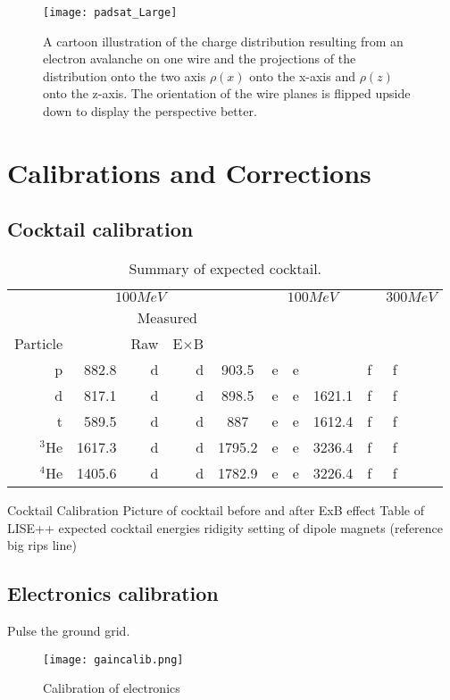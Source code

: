 \begin{figure}[H]
\texttt{[image: padsat\_Large]}
\caption{A cartoon illustration of the charge distribution resulting from an electron avalanche on one wire and the projections of the distribution onto the two axis $\rho(x)$ onto the x-axis and $\rho(z)$ onto the z-axis. The orientation of the wire planes is flipped upside down to display the perspective better.}
\label{fig:prf}
\end{figure}



\section{Calibrations and Corrections}


\subsection{Cocktail calibration}

\begin{table*}\centering
{}
\begin{tabular}{@{}rrrrcrrrcrrr@{}}\toprule
& \multicolumn{3}{c}{$100 MeV$} & \phantom{abc}& \multicolumn{3}{c}{$100 MeV$} &
\phantom{abc} & \multicolumn{3}{c}{$300 MeV$}\\
\cmidrule{2-4} \cmidrule{6-8} \cmidrule{10-12}
& &\multicolumn{2}{c}{Measured}\\
Particle &\phantom{abc} & Raw & E$\times$B\\
\midrule
p   & 882.8 & d & d & 903.5 & e & e &\phantom{abcdef} & f & f \\
d   & 817.1 & d & d & 898.5 & e & e & 1621.1 & f & f\\
t   & 589.5 & d & d & 887 & e & e & 1612.4 & f & f  \\
$^{3}$He  & 1617.3  & d & d & 1795.2 & e & e & 3236.4 & f & f\\
$^{4}$He  & 1405.6  & d & d & 1782.9 & e & e & 3226.4 & f & f \\
\bottomrule
\end{tabular}
\caption{Summary of expected cocktail. }
\label{tb:cocktailsummary}
\end{table*}

Cocktail Calibration 
Picture of cocktail before and after ExB effect
Table of LISE++ expected cocktail energies ridigity setting of dipole magnets (reference big rips line)



\subsection{Electronics calibration}
Pulse the ground grid. 
\begin{figure}[H]
\texttt{[image: gaincalib.png]}
\caption{Calibration of electronics}
\label{fig:gaincalib}
\end{figure}

